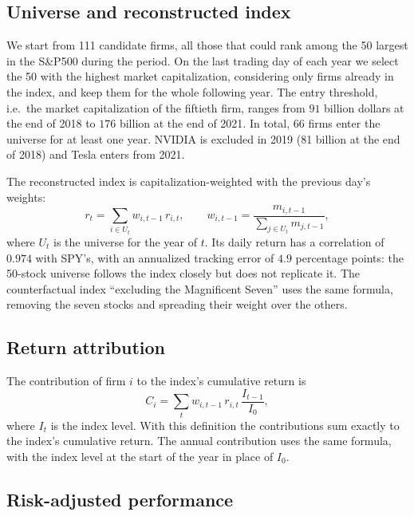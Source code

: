 \documentclass[12pt, a4paper]{article}
\begin{document}
\subsection{Universe and reconstructed index}

We start from 111 candidate firms, all those that could rank among the 50 largest in the S\&P500 during the period. On the last trading day of each year we select the 50 with the highest market capitalization, considering only firms already in the index, and keep them for the whole following year. The entry threshold, i.e.\ the market capitalization of the fiftieth firm, ranges from $91$ billion dollars at the end of 2018 to $176$ billion at the end of 2021. In total, 66 firms enter the universe for at least one year. NVIDIA is excluded in 2019 (81 billion at the end of 2018) and Tesla enters from 2021.

The reconstructed index is capitalization-weighted with the previous day's weights:
\begin{equation}
  r_t = \sum_{i \in U_t} w_{i,t-1}\, r_{i,t}, \qquad w_{i,t-1} = \frac{m_{i,t-1}}{\sum_{j \in U_t} m_{j,t-1}},
\end{equation}
where $U_t$ is the universe for the year of $t$. Its daily return has a correlation of $0.974$ with SPY's, with an annualized tracking error of $4.9$ percentage points: the 50-stock universe follows the index closely but does not replicate it. The counterfactual index ``excluding the Magnificent Seven'' uses the same formula, removing the seven stocks and spreading their weight over the others.

\subsection{Return attribution}
\label{sec:attribution}

The contribution of firm $i$ to the index's cumulative return is
\begin{equation}
  C_i = \sum_{t} w_{i,t-1}\, r_{i,t}\, \frac{I_{t-1}}{I_0},
\end{equation}
where $I_t$ is the index level. With this definition the contributions sum exactly to the index's cumulative return. The annual contribution uses the same formula, with the index level at the start of the year in place of $I_0$.

\subsection{Risk-adjusted performance}
\end{document}
